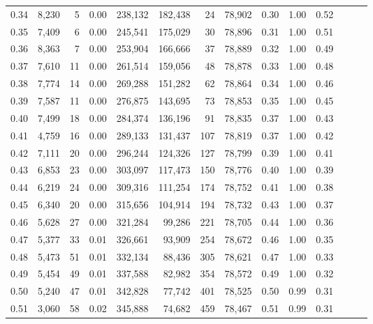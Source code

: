 \begin{tabular}{rrrrrrrrrrrrrr}
0.34 &   8,230 &      5 &  0.00 &  238,132 &  182,438 &      24 &  78,902 &  0.30 &  1.00 &      0.52 \\
0.35 &   7,409 &      6 &  0.00 &  245,541 &  175,029 &      30 &  78,896 &  0.31 &  1.00 &      0.51 \\
0.36 &   8,363 &      7 &  0.00 &  253,904 &  166,666 &      37 &  78,889 &  0.32 &  1.00 &      0.49 \\
0.37 &   7,610 &     11 &  0.00 &  261,514 &  159,056 &      48 &  78,878 &  0.33 &  1.00 &      0.48 \\
0.38 &   7,774 &     14 &  0.00 &  269,288 &  151,282 &      62 &  78,864 &  0.34 &  1.00 &      0.46 \\
0.39 &   7,587 &     11 &  0.00 &  276,875 &  143,695 &      73 &  78,853 &  0.35 &  1.00 &      0.45 \\
0.40 &   7,499 &     18 &  0.00 &  284,374 &  136,196 &      91 &  78,835 &  0.37 &  1.00 &      0.43 \\
0.41 &   4,759 &     16 &  0.00 &  289,133 &  131,437 &     107 &  78,819 &  0.37 &  1.00 &      0.42 \\
0.42 &   7,111 &     20 &  0.00 &  296,244 &  124,326 &     127 &  78,799 &  0.39 &  1.00 &      0.41 \\
0.43 &   6,853 &     23 &  0.00 &  303,097 &  117,473 &     150 &  78,776 &  0.40 &  1.00 &      0.39 \\
0.44 &   6,219 &     24 &  0.00 &  309,316 &  111,254 &     174 &  78,752 &  0.41 &  1.00 &      0.38 \\
0.45 &   6,340 &     20 &  0.00 &  315,656 &  104,914 &     194 &  78,732 &  0.43 &  1.00 &      0.37 \\
0.46 &   5,628 &     27 &  0.00 &  321,284 &   99,286 &     221 &  78,705 &  0.44 &  1.00 &      0.36 \\
0.47 &   5,377 &     33 &  0.01 &  326,661 &   93,909 &     254 &  78,672 &  0.46 &  1.00 &      0.35 \\
0.48 &   5,473 &     51 &  0.01 &  332,134 &   88,436 &     305 &  78,621 &  0.47 &  1.00 &      0.33 \\
0.49 &   5,454 &     49 &  0.01 &  337,588 &   82,982 &     354 &  78,572 &  0.49 &  1.00 &      0.32 \\
0.50 &   5,240 &     47 &  0.01 &  342,828 &   77,742 &     401 &  78,525 &  0.50 &  0.99 &      0.31 \\
0.51 &   3,060 &     58 &  0.02 &  345,888 &   74,682 &     459 &  78,467 &  0.51 &  0.99 &      0.31 \\

\end{tabular}
